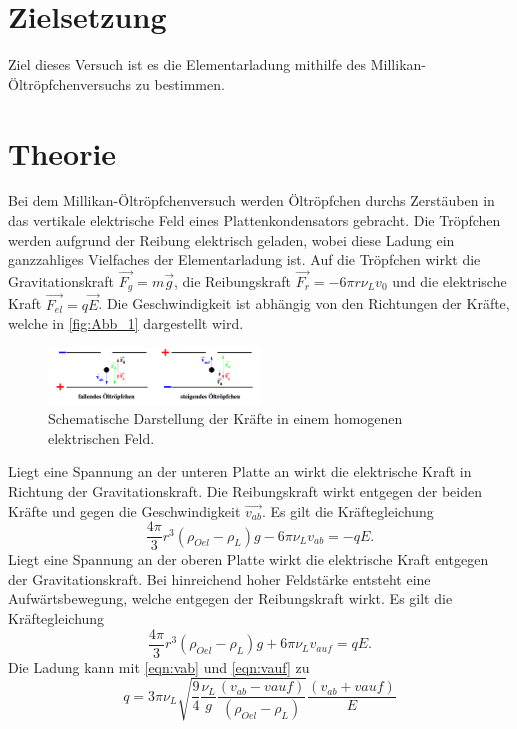 \section{Zielsetzung}
\label{sec:Zielsetzung}
Ziel dieses Versuch ist es die Elementarladung mithilfe des Millikan-Öltröpfchenversuchs zu bestimmen.
\section{Theorie}
\label{sec:Theorie}
Bei dem Millikan-Öltröpfchenversuch werden Öltröpfchen durchs Zerstäuben in das vertikale
elektrische Feld eines Plattenkondensators gebracht. Die Tröpfchen werden aufgrund der Reibung
elektrisch geladen, wobei diese Ladung ein ganzzahliges Vielfaches der Elementarladung ist.
Auf die Tröpfchen wirkt die Gravitationskraft $\vec{F_g}=m \vec{g}$, die Reibungskraft 
$\vec{F_r} = - 6 \pi r \nu_L v_0$ und die elektrische Kraft $\vec{F_{el}} = q \vec{E}$.
Die Geschwindigkeit ist abhängig von den Richtungen der Kräfte, welche in \autoref{fig:Abb_1} dargestellt wird.
\begin{figure}[H]
    \centering
    \includegraphics[width=0.5\textwidth]{Abbildungen/Abb_1.pdf}
    \caption {Schematische Darstellung der Kräfte in einem homogenen elektrischen Feld\cite[1]{V503}.}
    \label{fig:Abb_1}
\end{figure}
Liegt eine Spannung an der unteren Platte an wirkt die elektrische Kraft in Richtung der Gravitationskraft.
Die Reibungskraft wirkt entgegen der beiden Kräfte und gegen die Geschwindigkeit $\vec{v_{ab}}$.
Es gilt die Kräftegleichung
\begin{equation}
    \frac{4 \pi}{3} r^3 (\rho_{Oel}-\rho_L)g - 6 \pi \nu_L v_{ab} = - q E.
    \label{eqn:vab}
\end{equation}
Liegt eine Spannung an der oberen Platte wirkt die elektrische Kraft entgegen der Gravitationskraft.
Bei hinreichend hoher Feldstärke entsteht eine Aufwärtsbewegung, welche entgegen der Reibungskraft wirkt.
Es gilt die Kräftegleichung
\begin{equation}
    \frac{4\pi}{3} r^3 (\rho_{Oel}-\rho_L) g + 6 \pi \nu_L v_{auf} = q E.
    \label{eqn:vauf}
\end{equation}
Die Ladung kann mit \autoref{eqn:vab} und \autoref{eqn:vauf} zu
\begin{equation}
   q = 3 \pi \nu_L \sqrt{\frac{9}{4} \frac{\nu_L}{g} \frac{(v_{ab}-v{auf})}{(\rho_{Oel}-\rho_L)}} \frac{(v_{ab}+v{auf})}{E}
    \label{eqn:Ladung}
\end{equation}
